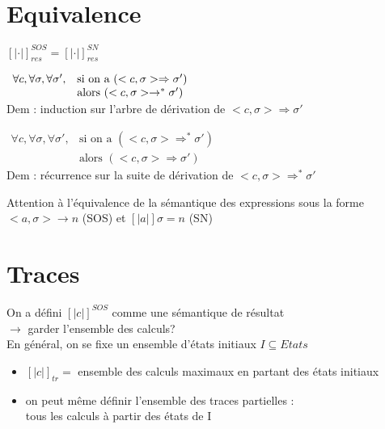 \documentclass[10pt,a4paper]{article}
\newcommand{\semm}[1]{\left[| #1 | \right]}
\begin{document}
\section{Equivalence}
\begin{thm}{} $ \semm{ \cdot }_{res}^{SOS} = \semm{ \cdot }_{res}^{SN}$\\
\end{thm}

\begin{lem}{1} 
$ \begin{array}{l l}
\forall c, \forall \sigma, \forall \sigma', & \text{si on a }(<c, \sigma> \Rightarrow \sigma')\\
											& \text{alors } (<c, \sigma> \rightarrow^* \sigma')
\end{array}$\\
Dem : induction sur l'arbre de dérivation de $<c, \sigma> \Rightarrow \sigma'$\\
\end{lem}

\begin{lem}{2} 
$ \begin{array}{ll}
\forall c, \forall \sigma, \forall \sigma', &\text{si on a }(<c, \sigma> \Rightarrow^* \sigma')\\
											& \text{alors } (<c, \sigma> \Rightarrow \sigma')
\end{array}$\\
Dem : récurrence sur la suite de dérivation de $<c, \sigma> \Rightarrow^* \sigma'$\\
\end{lem}

\begin{rem}{}Attention à l'équivalence de la sémantique des expressions sous la forme \\$<a, \sigma> \rightarrow n$ (SOS) et $\semm{a} \sigma = n$ (SN)\\
\end{rem}

\section{Traces}
On a défini $\semm{c}^{SOS}$ comme une sémantique de résultat\\
$\longrightarrow$ garder l'ensemble des calculs?\\
En général, on se fixe un ensemble d'états initiaux $I \subseteq Etats$
\begin{itemize}
\item $\semm{c}_{tr} = $ ensemble des calculs maximaux en partant des états initiaux
\item on peut même définir l'ensemble des traces partielles : \\
tous les calculs à partir des états de I
\end{itemize}
\end{document}
